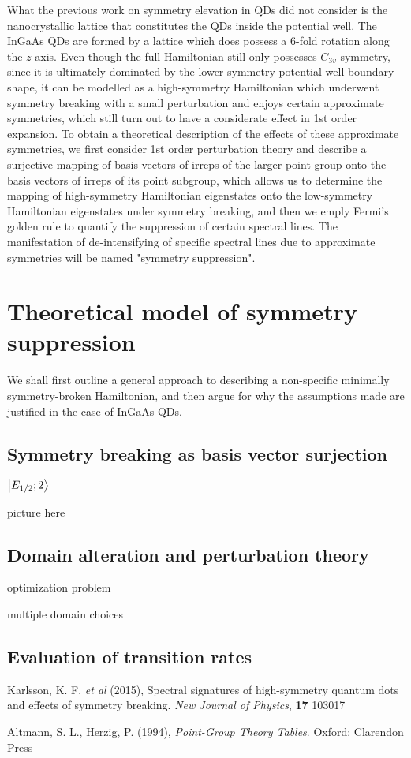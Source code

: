 \documentclass[12pt]{article}
\begin{document}
	What the previous work on symmetry elevation in QDs did not consider is the nanocrystallic lattice that constitutes the QDs inside the potential well. The InGaAs QDs are formed by a lattice which does possess a 6-fold rotation along the $z$-axis. Even though the full Hamiltonian still only possesses $C_{3v}$ symmetry, since it is ultimately dominated by the lower-symmetry potential well boundary shape, it can be modelled as a high-symmetry Hamiltonian which underwent symmetry breaking with a small perturbation and enjoys certain approximate symmetries, which still turn out to have a considerate effect in 1st order expansion. To obtain a theoretical description of the effects of these approximate symmetries, we first consider 1st order perturbation theory and describe a surjective mapping of basis vectors of irreps of the larger point group onto the basis vectors of irreps of its point subgroup, which allows us to determine the mapping of high-symmetry Hamiltonian eigenstates onto the low-symmetry Hamiltonian eigenstates under symmetry breaking, and then we emply Fermi's golden rule to quantify the suppression of certain spectral lines. The manifestation of de-intensifying of specific spectral lines due to approximate symmetries will be named "symmetry suppression".
	
	\section{Theoretical model of symmetry suppression}
	We shall first outline a general approach to describing a non-specific minimally symmetry-broken Hamiltonian, and then argue for why the assumptions made are justified in the case of InGaAs QDs. 
	\subsection{Symmetry breaking as basis vector surjection}
	
	$\ket{E_{1/2};2}$
	
	picture here
	\subsection{Domain alteration and perturbation theory}
	
	
	optimization problem
	
	multiple domain choices
	
	\subsection{Evaluation of transition rates}
	
	
	
	\begin{thebibliography}{10}

Karlsson, K. F. \textit{et al} (2015), Spectral signatures of high-symmetry quantum dots and effects of symmetry breaking. \textit{New Journal of Physics}, \textbf{17} 103017

Altmann, S. L., Herzig, P. (1994), \textit{Point-Group Theory Tables}. Oxford: Clarendon Press


\end{thebibliography}	
	
\end{document}
